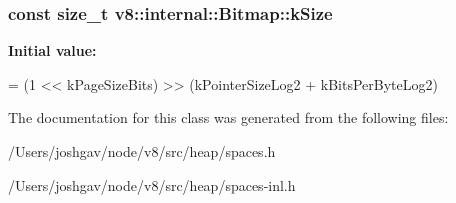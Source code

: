 \subsubsection[{\texorpdfstring{k\+Size}{kSize}}]{\setlength{\rightskip}{0pt plus 5cm}const size\+\_\+t v8\+::internal\+::\+Bitmap\+::k\+Size\hspace{0.3cm}{\ttfamily [static]}}\hypertarget{classv8_1_1internal_1_1_bitmap_aace66f0559638e54076e0d27b8d9ecc3}{}\label{classv8_1_1internal_1_1_bitmap_aace66f0559638e54076e0d27b8d9ecc3}
{\bfseries Initial value\+:}
\begin{DoxyCode}
=
      (1 << kPageSizeBits) >> (kPointerSizeLog2 + kBitsPerByteLog2)
\end{DoxyCode}


The documentation for this class was generated from the following files\+:\begin{DoxyCompactItemize}
\item 
/\+Users/joshgav/node/v8/src/heap/spaces.\+h\item 
/\+Users/joshgav/node/v8/src/heap/spaces-\/inl.\+h\end{DoxyCompactItemize}
